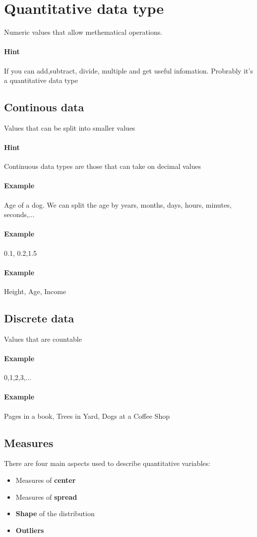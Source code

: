 \documentclass[]{article}
\begin{document}
\section{Quantitative data type}
Numeric values that allow methematical operations.
\paragraph{Hint} If you can add,subtract, divide, multiple and get useful infomation. Probrably it's a quantitative data type
\subsection{Continous data}
Values that can be split into smaller values
\paragraph{Hint} Continuous data types are those that can take on decimal values
\paragraph{Example} Age of a dog. We can split the age by years, months, days, hours, minutes, seconds,...
\paragraph{Example} 0.1, 0.2,1.5
\paragraph{Example} Height, Age, Income

\subsection{Discrete data}
Values that are countable
\paragraph{Example} 0,1,2,3,...
\paragraph{Example} Pages in a book, Trees in Yard, Dogs at a Coffee Shop


\subsection{Measures}
There are four main aspects used to describe quantitative variables:
\begin{itemize}
\item Measures of \textbf{center}
\item Measures of \textbf{spread}
\item \textbf{Shape} of the distribution
\item \textbf{Outliers}
\end{itemize}
\end{document}
